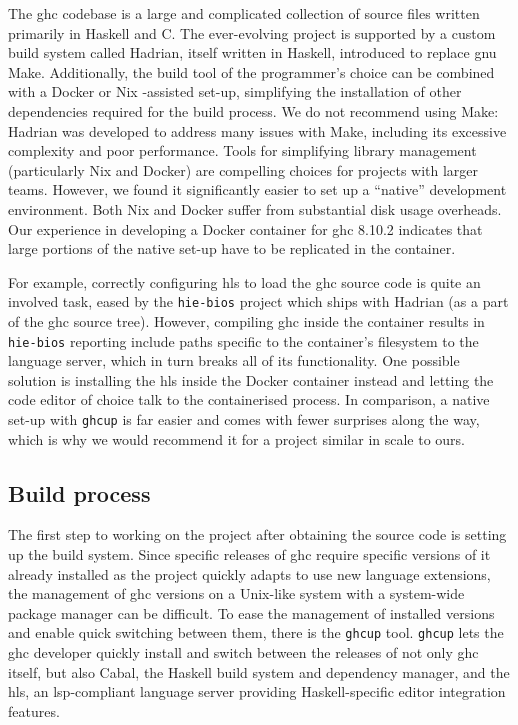 \documentclass[thesis=B,english]{FITthesis}[2019/12/23]
\begin{document}
The \acrshort{ghc} codebase is a large and complicated collection of source
files written primarily in Haskell and C\cite{arch-ghc}. The ever-evolving
project is supported by a custom build system called Hadrian\cite{hadrian},
itself written in Haskell, introduced to replace \acrshort{gnu} Make.
Additionally, the build tool of the programmer's choice can be combined with a
Docker or Nix -assisted set-up, simplifying the installation of other
dependencies required for the build process. We do not recommend using Make:
Hadrian was developed to address many issues with Make, including its excessive
complexity and poor performance.  Tools for simplifying library management
(particularly Nix and Docker) are compelling choices for projects with larger
teams. However, we found it significantly easier to set up a ``native''
development environment. Both Nix and Docker suffer from substantial disk usage
overheads. Our experience in developing a Docker container for \acrshort{ghc}
8.10.2 indicates that large portions of the native set-up have to be replicated
in the container.

For example, correctly configuring \acrshort{hls} to load the \acrshort{ghc}
source code is quite an involved task, eased by the \texttt{hie-bios}
project\cite{gh-hie-bios} which ships with Hadrian (as a part of the
\acrshort{ghc} source tree). However, compiling \acrshort{ghc} inside the
container results in \texttt{hie-bios} reporting include paths specific to the
container's file\-system to the language server, which in turn breaks all of
its functionality. One possible solution is installing the \acrshort{hls}
inside the Docker container instead and letting the code editor of choice talk
to the containerised process. In comparison, a native set-up with
\texttt{ghcup} is far easier and comes with fewer surprises along the way,
which is why we would recommend it for a project similar in scale to ours.

\subsection*{Build process}
The first step to working on the project after obtaining the source code is
setting up the build system. Since specific releases of \acrshort{ghc} require
specific versions of it already installed as the project quickly adapts to use
new language extensions, the management of \acrshort{ghc} versions on a
Unix-like system with a system-wide package manager can be difficult. To ease
the management of installed versions and enable quick switching between them,
there is the \texttt{ghcup} tool\cite{ghcup}. \texttt{ghcup} lets the
\acrshort{ghc} developer quickly install and switch between the releases of not
only \acrshort{ghc} itself, but also Cabal, the Haskell build system and
dependency manager, and the \acrfull{hls}, an \acrshort{lsp}-compliant language
server providing Haskell-specific editor integration features.
\end{document}
